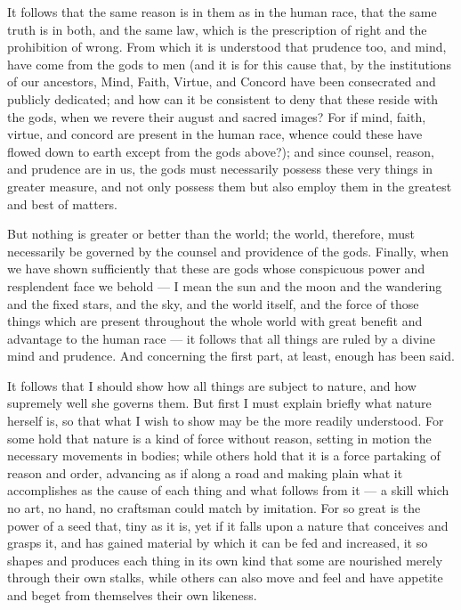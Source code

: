  It follows that the same reason is in them as in the human race, that the same truth is in both, and the same law, which is the prescription of right and the prohibition of wrong. From which it is understood that prudence too, and mind, have come from the gods to men (and it is for this cause that, by the institutions of our ancestors, Mind, Faith, Virtue, and Concord have been consecrated and publicly dedicated; and how can it be consistent to deny that these reside with the gods, when we revere their august and sacred images? For if mind, faith, virtue, and concord are present in the human race, whence could these have flowed down to earth except from the gods above?); and since counsel, reason, and prudence are in us, the gods must necessarily possess these very things in greater measure, and not only possess them but also employ them in the greatest and best of matters.

 But nothing is greater or better than the world; the world, therefore, must necessarily be governed by the counsel and providence of the gods. Finally, when we have shown sufficiently that these are gods whose conspicuous power and resplendent face we behold --- I mean the sun and the moon and the wandering and the fixed stars, and the sky, and the world itself, and the force of those things which are present throughout the whole world with great benefit and advantage to the human race --- it follows that all things are ruled by a divine mind and prudence. And concerning the first part, at least, enough has been said.

 It follows that I should show how all things are subject to nature, and how supremely well she governs them. But first I must explain briefly what nature herself is, so that what I wish to show may be the more readily understood. For some hold that nature is a kind of force without reason, setting in motion the necessary movements in bodies; while others hold that it is a force partaking of reason and order, advancing as if along a road and making plain what it accomplishes as the cause of each thing and what follows from it — a skill which no art, no hand, no craftsman could match by imitation. For so great is the power of a seed that, tiny as it is, yet if it falls upon a nature that conceives and grasps it, and has gained material by which it can be fed and increased, it so shapes and produces each thing in its own kind that some are nourished merely through their own stalks, while others can also move and feel and have appetite and beget from themselves their own likeness.

